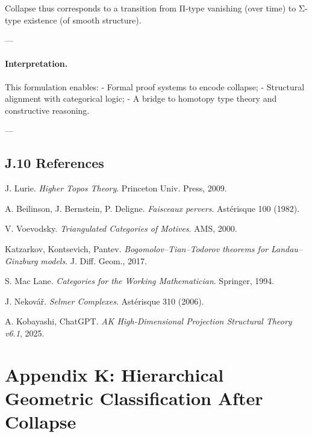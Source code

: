 \documentclass[11pt]{article}
\begin{document}
\begin{axiom}
\begin{axiom}
Collapse thus corresponds to a transition from Π-type vanishing (over time) to Σ-type existence (of smooth structure).

---

\paragraph{Interpretation.}
This formulation enables:
- Formal proof systems to encode collapse;
- Structural alignment with categorical logic;
- A bridge to homotopy type theory and constructive reasoning.

---

\subsection*{J.10 References}

\begin{thebibliography}{9}

J. Lurie.  
\textit{Higher Topos Theory}. Princeton Univ. Press, 2009.

A. Beilinson, J. Bernstein, P. Deligne.  
\textit{Faisceaux pervers}. Astérisque 100 (1982).

V. Voevodsky.  
\textit{Triangulated Categories of Motives}. AMS, 2000.

Katzarkov, Kontsevich, Pantev.  
\textit{Bogomolov–Tian–Todorov theorems for Landau–Ginzburg models}. J. Diff. Geom., 2017.

S. Mac Lane.  
\textit{Categories for the Working Mathematician}. Springer, 1994.

J. Nekovář.  
\textit{Selmer Complexes}. Astérisque 310 (2006).

A. Kobayashi, ChatGPT.  
\textit{AK High-Dimensional Projection Structural Theory v6.1}, 2025.

\end{thebibliography}




\section*{Appendix K: Hierarchical Geometric Classification After Collapse}


\end{axiom}
\end{axiom}
\end{document}
